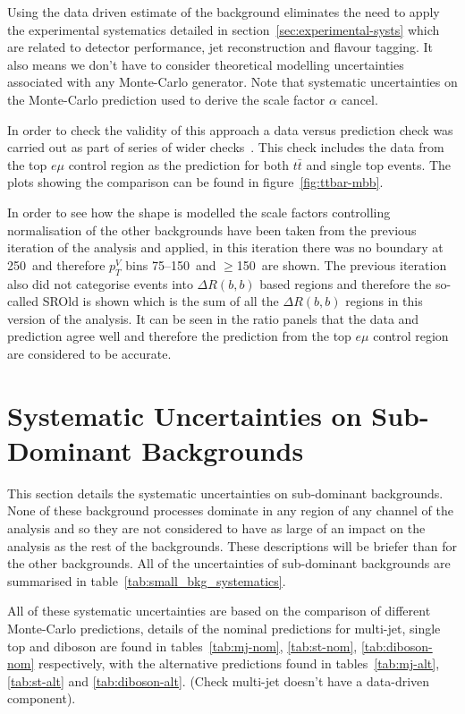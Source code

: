 Using the data driven estimate of the background eliminates the need to apply
the experimental systematics detailed in section~\ref{sec:experimental-systs}
which are related to detector performance, jet reconstruction and flavour
tagging. It also means we don't have to consider theoretical modelling
uncertainties associated with any Monte-Carlo generator. Note that systematic
uncertainties on the Monte-Carlo prediction used to derive the scale factor
$\alpha$ cancel.

In order to check the validity of this approach a data versus prediction check
was carried out as part of series of wider checks~\cite{VHModellingNote2019}.
This check includes the data from the top $e\mu$ control region as the
prediction for both $t\bar{t}$ and single top events. The plots showing the
comparison can be found in figure~\ref{fig:ttbar-mbb}.

In order to see how the shape is modelled the scale factors controlling
normalisation of the other backgrounds have been taken from the previous
iteration of the analysis and applied, in this iteration there was no boundary
at 250~\GeV and therefore $p_T^V$ bins 75--150~\GeV and $\geq$150~\GeV are
shown. The previous iteration also did not categorise events into $\Delta R(b,
b)$ based regions and therefore the so-called SROld is shown which is the sum of
all the $\Delta R(b, b)$ regions in this version of the analysis. It can be seen
in the ratio panels that the data and prediction agree well and therefore the
prediction from the top $e\mu$ control region are considered to be accurate.

\clearpage
\newpage

\section{Systematic Uncertainties on Sub-Dominant Backgrounds}

This section details the systematic uncertainties on sub-dominant backgrounds.
None of these background processes dominate in any region of any channel of the
analysis and so they are not considered to have as large of an impact on the
analysis as the rest of the backgrounds. These descriptions will be briefer than
for the other backgrounds. All of the uncertainties of sub-dominant backgrounds
are summarised in table~\ref{tab:small_bkg_systematics}.

All of these systematic uncertainties are based on the comparison of different
Monte-Carlo predictions, details of the nominal predictions for multi-jet,
single top and diboson are found in tables~\ref{tab:mj-nom}, \ref{tab:st-nom},
\ref{tab:diboson-nom} respectively, with the alternative predictions found in
tables~\ref{tab:mj-alt}, \ref{tab:st-alt} and \ref{tab:diboson-alt}. (Check
multi-jet doesn't have a data-driven component).


